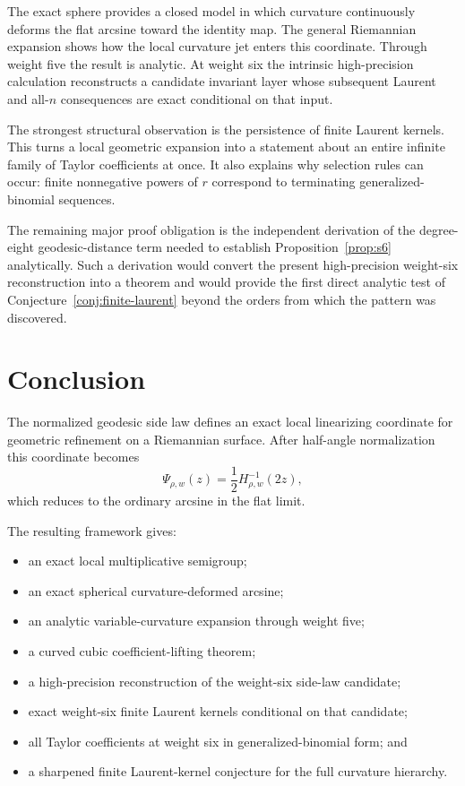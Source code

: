 \documentclass[11pt]{article}
\theoremstyle{definition}
\theoremstyle{remark}
\begin{document}
The exact sphere provides a closed model in which curvature continuously
deforms the flat arcsine toward the identity map.  The general Riemannian
expansion shows how the local curvature jet enters this coordinate.  Through
weight five the result is analytic.  At weight six the intrinsic
high-precision calculation reconstructs a candidate invariant layer whose
subsequent Laurent and all-\(n\) consequences are exact conditional on that
input.

The strongest structural observation is the persistence of finite Laurent
kernels.  This turns a local geometric expansion into a statement about an
entire infinite family of Taylor coefficients at once.  It also explains why
selection rules can occur: finite nonnegative powers of \(r\) correspond to
terminating generalized-binomial sequences.

The remaining major proof obligation is the independent derivation of the
degree-eight geodesic-distance term needed to establish
Proposition~\ref{prop:s6} analytically.  Such a derivation would convert the
present high-precision weight-six reconstruction into a theorem and would
provide the first direct analytic test of
Conjecture~\ref{conj:finite-laurent} beyond the orders from which the pattern
was discovered.

\section{Conclusion}
\label{sec:conclusion}

The normalized geodesic side law defines an exact local linearizing coordinate
for geometric refinement on a Riemannian surface.  After half-angle
normalization this coordinate becomes
\[
\Psi_{\rho,w}(z)=\frac12H_{\rho,w}^{-1}(2z),
\]
which reduces to the ordinary arcsine in the flat limit.

The resulting framework gives:
\begin{itemize}
\item an exact local multiplicative semigroup;
\item an exact spherical curvature-deformed arcsine;
\item an analytic variable-curvature expansion through weight five;
\item a curved cubic coefficient-lifting theorem;
\item a high-precision reconstruction of the weight-six side-law candidate;
\item exact weight-six finite Laurent kernels conditional on that candidate;
\item all Taylor coefficients at weight six in generalized-binomial form; and
\item a sharpened finite Laurent-kernel conjecture for the full curvature
      hierarchy.
\end{itemize}
\end{document}
